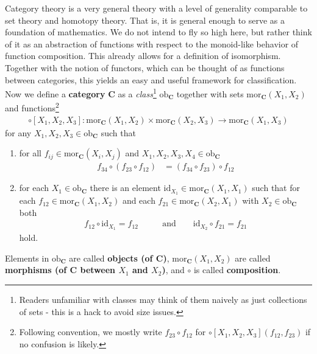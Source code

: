 \nocite{8b5861fc}
Category theory is a very general theory with a level of generality comparable to set theory and homotopy theory.
That is, it is general enough to serve as a {\glqq}foundation of mathematics{\grqq}.
We do not intend to fly so high here, but rather think of it as an abstraction of functions with respect to the monoid-like behavior of function composition.
This already allows for a definition of isomorphism.
Together with the notion of functors, which can be thought of as functions between categories, this yields an easy and useful framework for classification.
\\
Now we define a \textbf{category} $\mathbf{C}$ as a \textit{class}\footnote{Readers unfamiliar with classes may think of them naively as just collections of sets - this is a hack to avoid {\glqq}size issues{\grqq}.} $\mathrm{ob}_{\mathbf{C}}$ together with sets $\mathrm{mor}_{\mathbf{C}}(X_{1},X_{2})$ and functions\footnote{Following convention, we mostly write $f_{23} \circ f_{12}$ for $\circ[X_{1},X_{2},X_{3}](f_{12},f_{23})$ if no confusion is likely.}
\begin{align*}
  \circ[X_{1},X_{2},X_{3}]
  \colon
  \mathrm{mor}_{\mathbf{C}}(X_{1},X_{2})
  \times
  \mathrm{mor}_{\mathbf{C}}(X_{2},X_{3})
  \to
  \mathrm{mor}_{\mathbf{C}}(X_{1},X_{3})
\end{align*}
for any $X_{1},X_{2},X_{3} \in \mathrm{ob}_{\mathbf{C}}$ such that
\begin{enumerate}
\item[(C1)]
for all $f_{ij} \in \mathrm{mor}_{\mathbf{C}}(X_{i},X_{j})$ and $X_{1},X_{2},X_{3},X_{4} \in \mathrm{ob}_{\mathbf{C}}$
\begin{align*}
  f_{34}
  \circ
  (f_{23} \circ f_{12})
  &=
  (f_{34} \circ f_{23})
  \circ
  f_{12}
\end{align*}
\item[(C2)]
for each $X_{1} \in \mathrm{ob}_{\mathbf{C}}$ there is an element $\mathrm{id}_{X_{1}} \in \mathrm{mor}_{\mathbf{C}}(X_{1},X_{1})$ such that for each $f_{12} \in \mathrm{mor}_{\mathbf{C}}(X_{1},X_{2})$ and each $f_{21} \in \mathrm{mor}_{\mathbf{C}}(X_{2},X_{1})$ with $X_{2} \in \mathrm{ob}_{\mathbf{C}}$ both
\begin{align*}
  f_{12}
  \circ
  \mathrm{id}_{X_{1}}
  =
  f_{12}
  \qquad
  &\text{and}
  \qquad
  \mathrm{id}_{X_{2}}
  \circ
  f_{21}
  =
  f_{21}
\end{align*}
hold.
\end{enumerate}
Elements in $\mathrm{ob}_{\mathbf{C}}$ are called \textbf{objects (of $\mathbf{C}$)}, $\mathrm{mor}_{\mathbf{C}}(X_{1},X_{2})$ are called \textbf{morphisms (of $\mathbf{C}$ between $X_{1}$ and $X_{2}$)}, and $\circ$ is called \textbf{composition}.
